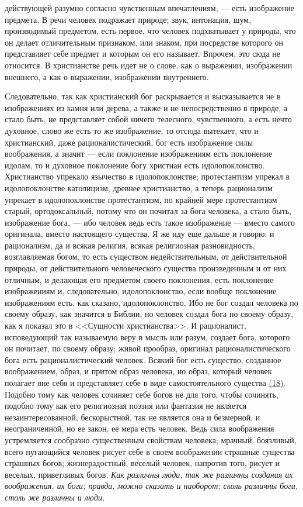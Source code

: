 \documentclass[12pt]{article}
\begin{document}
действующей разумно согласно чувственным впечатлениям, --- есть изображение предмета. В речи человек подражает природе; звук, интонация, шум, производимый предметом, есть первое, что человек подхватывает у природы, что он делает отличительным признаком, или знаком, при посредстве которого он представляет себе предмет и которым он его называет. Впрочем, это сюда не относится. В христианстве речь идет не о слове, как о выражении, изображении внешнего, а как о выражении, изображении внутреннего. 

Следовательно, так как христианский бог раскрывается и высказывается не в изображениях из камня или дерева, а также и не непосредственно в природе, а стало быть, не представляет собой ничего телесного, чувственного, а есть нечто духовное, слово же есть то же изображение, то отсюда вытекает, что и христианский, даже рационалистический, бог есть изображение силы воображения, а значит --- если поклонение изображениям есть поклонение идолам, то и духовное поклонение богу христиан есть идолопоклонство. Христианство упрекало язычество в идолопоклонстве; протестантизм упрекал в идолопоклонстве католицизм, древнее христианство, а теперь рационализм упрекает в идолопоклонстве протестантизм, по крайней мере протестантизм старый, ортодоксальный, потому что он почитал за бога человека, а стало быть, изображение бога, --- ибо человек ведь есть такое изображение --- вместо самого оригинала, вместо настоящего существа. Я же иду еще дальше и говорю: и рационализм, да и всякая религия, всякая религиозная разновидность, возглавляемая богом, то есть существом недействительным, от действительной природы, от действительного человеческого существа произведенным и от них отличным, и делающая его предметом своего поклонения, есть поклонение изображениям и, следовательно, идолопоклонство, если вообще поклонение изображениям есть, как сказано, идолопоклонство. Ибо не бог создал человека по своему образу, как значится в Библии, но человек создал бога по своему образу, как я показал это в <<Сущности христианства>>. И рационалист, исповедующий так называемую веру в мысль или разум, создает бога, которого он почитает, по своему образу; живой прообраз, оригинал рационалистического бога есть рационалистический человек. Всякий бог есть существо, созданное воображением, образ, и притом образ человека, но образ, который человек полагает вне себя и представляет себе в виде самостоятельного существа \hyperlink{18}{(18)}\hypertarget{b18}{}. Подобно тому как человек сочиняет себе богов не для того, чтобы сочинять, подобно тому как его религиозная поэзия или фантазия не является незаинтересованной, бескорыстной, так не является она и безмерной, и неограниченной, но ее закон, ее мера есть человек. Ведь сила воображения устремляется сообразно существенным свойствам человека; мрачный, боязливый, всего пугающийся человек рисует себе в своем воображении страшные существа страшных богов; жизнерадостный, веселый человек, напротив того, рисует и веселых, приветливых богов. \emph{Как различны люди, так же различны создания их воображения, их боги; правда, можно сказать и наоборот: сколь различны боги, столь же различны и люди.}
\end{document}
